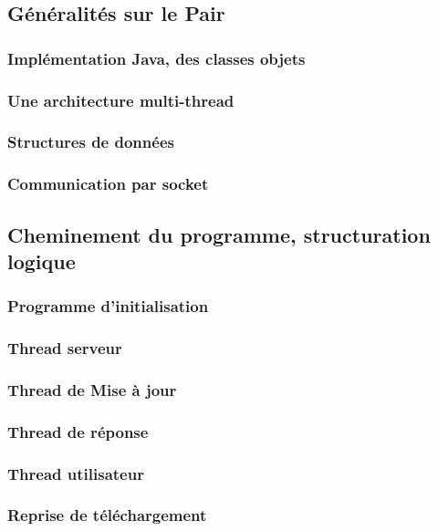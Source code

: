 
\subsection{Généralités sur le Pair}

\subsubsection{Implémentation Java, des classes objets}

\subsubsection{Une architecture multi-thread}

\subsubsection{Structures de données}

\subsubsection{Communication par socket}




\subsection{Cheminement du programme, structuration logique}

\subsubsection{Programme d'initialisation}
\subsubsection{Thread serveur}
\subsubsection{Thread de Mise à jour}
\subsubsection{Thread de réponse}
\subsubsection{Thread utilisateur}

\subsubsection{Reprise de téléchargement}

